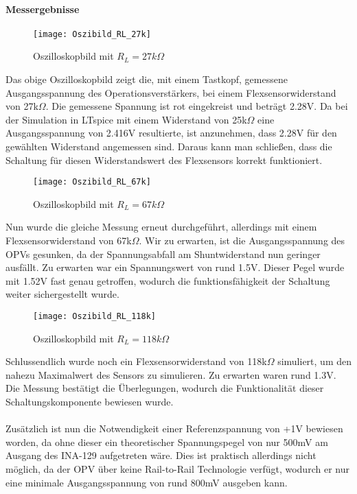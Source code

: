 \documentclass[titlepage,12pt,twoside]{article}
\begin{document}
\paragraph{Messergebnisse}
\label{par:Messergebnisse}
\hfill \break
\hfill \break
\begin{figure}[H]
	\begin{center}
		\scalebox{1.2}
		{\texttt{[image: Oszibild\_RL\_27k]}}
		\caption{Oszilloskopbild mit $R_{L} = 27k\Omega$}
		\label{fig:Oszibild_RL_27k}		
	\end{center}
\end{figure}
Das obige Oszilloskopbild zeigt die, mit einem Tastkopf, gemessene Ausgangsspannung des Operationsverstärkers, bei einem Flexsensorwiderstand
von 27k$\Omega$. Die gemessene Spannung ist rot eingekreist und beträgt 2.28V. Da bei der Simulation in LTspice mit einem Widerstand 
von 25k$\Omega$ eine Ausgangsspannung von 2.416V resultierte, ist anzunehmen, dass 2.28V 
für den gewählten Widerstand angemessen sind. Daraus kann man schließen, dass die Schaltung
für diesen Widerstandswert des Flexsensors korrekt funktioniert.
\\
\begin{figure}[H]
	\begin{center}
		\scalebox{1.0}
		{\texttt{[image: Oszibild\_RL\_67k]}}
		\caption{Oszilloskopbild mit $R_{L} = 67k\Omega$}
		\label{fig:Oszibild_RL_67k}		
	\end{center}
\end{figure}
\hfill \break
Nun wurde die gleiche Messung erneut durchgeführt, allerdings mit einem Flexsensorwiderstand
von 67k$\Omega$. Wir zu erwarten, ist die Ausgangsspannung des OPVs gesunken, da der 
Spannungsabfall am Shuntwiderstand nun geringer ausfällt. Zu erwarten war ein Spannungswert
von rund 1.5V. Dieser Pegel wurde mit 1.52V fast genau getroffen, wodurch die funktionsfähigkeit
der Schaltung weiter sichergestellt wurde.
\begin{figure}[H]
	\begin{center}
		\scalebox{1.0}
		{\texttt{[image: Oszibild\_RL\_118k]}}
		\caption{Oszilloskopbild mit $R_{L} = 118k\Omega$}
		\label{fig:Oszibild_RL_118k}		
	\end{center}
\end{figure}
\hfill \break
Schlussendlich wurde noch ein Flexsensorwiderstand von 118k$\Omega$ simuliert, um den
nahezu Maximalwert des Sensors zu simulieren. Zu erwarten waren rund 1.3V. Die Messung
bestätigt die Überlegungen, wodurch die Funktionalität dieser Schaltungskomponente bewiesen
wurde. \\
\\
Zusätzlich ist nun die Notwendigkeit einer Referenzspannung von +1V bewiesen worden, da
ohne dieser ein theoretischer Spannungspegel von nur 500mV am Ausgang des INA-129 aufgetreten
wäre.  Dies ist praktisch allerdings nicht möglich, da der OPV über keine Rail-to-Rail
Technologie verfügt, wodurch er nur eine minimale Ausgangsspannung von rund 800mV ausgeben 
kann.
\\
\end{document}
